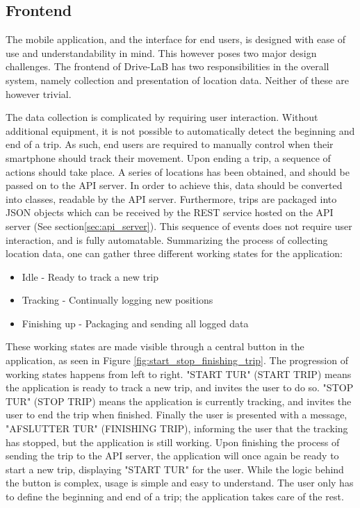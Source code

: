 \subsection{Frontend}\label{subsec:frontend_design}
The mobile application, and the interface for end users, is designed with ease of use and understandability in mind. This however poses two major design challenges. The frontend of Drive-LaB has two responsibilities in the overall system, namely collection and presentation of location data. Neither of these are however trivial.

The data collection is complicated by requiring user interaction. Without additional equipment, it is not possible to automatically detect the beginning and end of a trip. As such, end users are required to manually control when their smartphone should track their movement. Upon ending a trip, a sequence of actions should take place. A series of locations has been obtained, and should be passed on to the API server. In order to achieve this, data should be converted into classes, readable by the API server. Furthermore, trips are packaged into JSON objects which can be received by the REST service hosted on the API server (See section\ref{sec:api_server}). This sequence of events does not require user interaction, and is fully automatable. Summarizing the process of collecting location data, one can gather three different working states for the application:

\begin{itemize}
\item Idle - Ready to track a new trip
\item Tracking - Continually logging new positions
\item Finishing up - Packaging and sending all logged data
\end{itemize}

These working states are made visible through a central button in the application, as seen in Figure \ref{fig:start_stop_finishing_trip}. The progression of working states happens from left to right. "START TUR" (START TRIP) means the application is ready to track a new trip, and invites the user to do so. "STOP TUR" (STOP TRIP) means the application is currently tracking, and invites the user to end the trip when finished. Finally the user is presented with a message, "AFSLUTTER TUR" (FINISHING TRIP), informing the user that the tracking has stopped, but the application is still working. Upon finishing the process of sending the trip to the API server, the application will once again be ready to start a new trip, displaying "START TUR" for the user.
While the logic behind the button is complex, usage is simple and easy to understand. The user only has to define the beginning and end of a trip; the application takes care of the rest.

